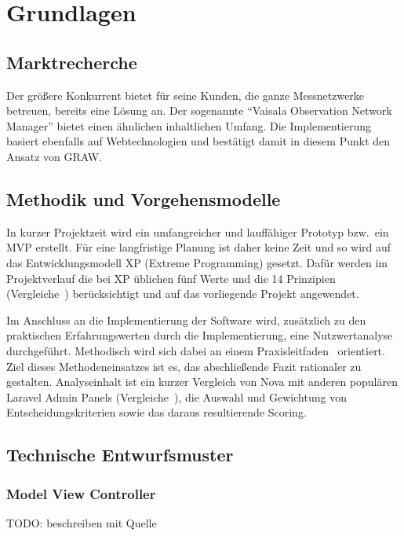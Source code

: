 \section{Grundlagen}

\subsection{Marktrecherche}
Der größere Konkurrent bietet für seine Kunden, die ganze Messnetzwerke betreuen, bereits eine Lösung an.
Der sogenannte \enquote{Vaisala Observation Network Manager}\cite{observation-network-manager} bietet einen ähnlichen inhaltlichen Umfang.
Die Implementierung basiert ebenfalls auf Webtechnologien und bestätigt damit in diesem Punkt den Ansatz von GRAW.

\subsection{Methodik und Vorgehensmodelle}
In kurzer Projektzeit wird ein umfangreicher und lauffähiger Prototyp bzw.\ ein MVP erstellt.
Für eine langfristige Planung ist daher keine Zeit und so wird auf das Entwicklungsmodell XP (Extreme Programming) gesetzt.
Dafür werden im Projektverlauf die bei XP üblichen fünf Werte und die 14 Prinzipien (Vergleiche~\cite{agile-prozesse}) berücksichtigt und auf das vorliegende Projekt angewendet.

Im Anschluss an die Implementierung der Software wird, zusätzlich zu den praktischen Erfahrungswerten durch die Implementierung, eine Nutzwertanalyse durchgeführt.
Methodisch wird sich dabei an einem Praxisleitfaden~\cite{scoring-und-nutzwertanalysen} orientiert.
Ziel dieses Methodeneinsatzes ist es, das abschließende Fazit rationaler zu gestalten.
Analyseinhalt ist ein kurzer Vergleich von Nova mit anderen populären Laravel Admin Panels (Vergleiche~\cite{the-guide-to-laravel-admin-panels}), die Auswahl und Gewichtung von Entscheidungskriterien sowie das daraus resultierende Scoring.

\subsection{Technische Entwurfsmuster}

\subsubsection{Model View Controller}
TODO: beschreiben mit Quelle
\newpage

